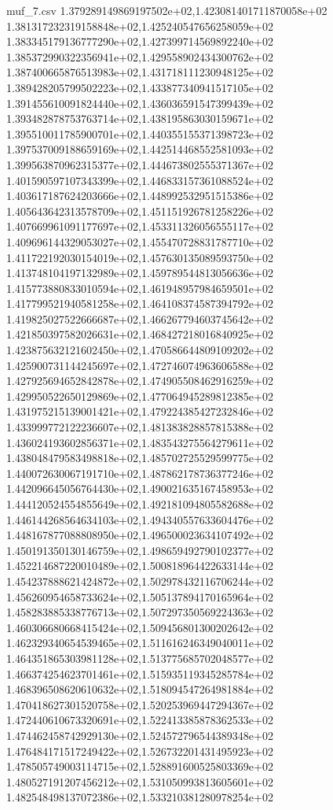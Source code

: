 \begin{filecontents*}{muf_7.csv}
1.379289149869197502e+02,1.423081401711870058e+02
1.381317232319158848e+02,1.425240547656258059e+02
1.383345179136777290e+02,1.427399714569892240e+02
1.385372990322356941e+02,1.429558902434300762e+02
1.387400665876513983e+02,1.431718111230948125e+02
1.389428205799502223e+02,1.433877340941517105e+02
1.391455610091824440e+02,1.436036591547399439e+02
1.393482878753763714e+02,1.438195863030159671e+02
1.395510011785900701e+02,1.440355155371398723e+02
1.397537009188659169e+02,1.442514468552581093e+02
1.399563870962315377e+02,1.444673802555371367e+02
1.401590597107343399e+02,1.446833157361088524e+02
1.403617187624203666e+02,1.448992532951515386e+02
1.405643642313578709e+02,1.451151926781258226e+02
1.407669961091177697e+02,1.453311326056555117e+02
1.409696144329053027e+02,1.455470728831787710e+02
1.411722192030154019e+02,1.457630135089593750e+02
1.413748104197132989e+02,1.459789544813056636e+02
1.415773880833010594e+02,1.461948957984659501e+02
1.417799521940581258e+02,1.464108374587394792e+02
1.419825027522666687e+02,1.466267794603745642e+02
1.421850397582026631e+02,1.468427218016840925e+02
1.423875632121602450e+02,1.470586644809109202e+02
1.425900731144245697e+02,1.472746074963606588e+02
1.427925694652842878e+02,1.474905508462916259e+02
1.429950522650129869e+02,1.477064945289812385e+02
1.431975215139001421e+02,1.479224385427232846e+02
1.433999772122236607e+02,1.481383828857815388e+02
1.436024193602856371e+02,1.483543275564279611e+02
1.438048479583498818e+02,1.485702725529599775e+02
1.440072630067191710e+02,1.487862178736377246e+02
1.442096645056764430e+02,1.490021635167458953e+02
1.444120524554855649e+02,1.492181094805582688e+02
1.446144268564634103e+02,1.494340557633604476e+02
1.448167877088808950e+02,1.496500023634107492e+02
1.450191350130146759e+02,1.498659492790102377e+02
1.452214687220010489e+02,1.500818964422633144e+02
1.454237888621424872e+02,1.502978432116706244e+02
1.456260954658733624e+02,1.505137894170165964e+02
1.458283885338776713e+02,1.507297350569224363e+02
1.460306680668415424e+02,1.509456801300202642e+02
1.462329340654539465e+02,1.511616246349040011e+02
1.464351865303981128e+02,1.513775685702048577e+02
1.466374254623701461e+02,1.515935119345285784e+02
1.468396508620610632e+02,1.518094547264981884e+02
1.470418627301520758e+02,1.520253969447294367e+02
1.472440610673320691e+02,1.522413385878362533e+02
1.474462458742929130e+02,1.524572796544389348e+02
1.476484171517249422e+02,1.526732201431495923e+02
1.478505749003114715e+02,1.528891600525803369e+02
1.480527191207456212e+02,1.531050993813605601e+02
1.482548498137072386e+02,1.533210381280978254e+02

\end{filecontents*}
